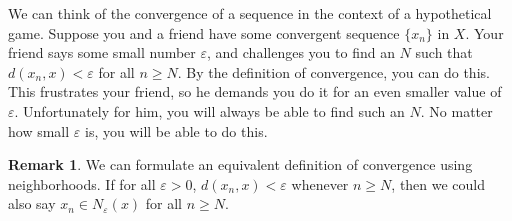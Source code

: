 \documentclass{article}
\theoremstyle{definition}
\newtheorem{remark}{Remark}[section]
\begin{document}
We can think of the convergence of a sequence in the context of a hypothetical game. Suppose you and a friend have some convergent sequence $ \{x_n\} $ in $ X $. Your friend says some small number $ \varepsilon $, and challenges you to find an $ N $ such that $ d(x_n,x)<\varepsilon $ for all $ n\ge N $. By the definition of convergence, you can do this. This frustrates your friend, so he demands you do it for an even smaller value of $ \varepsilon $. Unfortunately for him, you will always be able to find such an $ N $. No matter how small $ \varepsilon $ is, you will be able to do this. 
\begin{remark}
	We can formulate an equivalent definition of convergence using neighborhoods. If for all  $ \varepsilon>0 $, $ d(x_n,x)<\varepsilon $ whenever $ n\ge N $, then we could also say $ x_n\in N_\varepsilon(x) $ for all $ n\ge N $. 
\end{remark}
\end{document}
